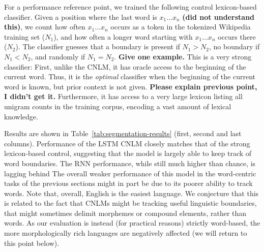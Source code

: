 For a performance reference point, we trained the following control
lexicon-based classifier.  Given a position where the last word is
$x_1...x_n$ \textbf{(did not understand this)}, we count how often
$x_1...x_n$ occurs as a token in the tokenized Wikipedia training set
($N_1$), and how often a longer word starting with $x_1...x_n$ occurs
there ($N_2$).  The classifier guesses that a boundary is present if
$N_1 > N_2$, no boundary if $N_1 < N_2$, and randomly if $N_1 =
N_2$. \textbf{Give one example.}  This is a very strong classifier:
First, unlike the CNLM, it has oracle access to the beginning of the
current word.  Thus, it is the \emph{optimal} classifier when the
beginning of the current word is known, but prior context is not
given. \textbf{Please explain previous point, I didn't get it.}
Furthermore, it has access to a very large lexicon listing all unigram
counts in the training corpus, encoding a vast amount of lexical
knowledge.

Results are shown in Table~\ref{tab:segmentation-results} (first,
second and last columns). Performance of the LSTM CNLM closely matches
that of the strong lexicon-based control, suggesting that the model is
largely able to keep track of word boundaries. The RNN performance,
while still much higher than chance, is lagging behind The overall
weaker performance of this model in the word-centric tasks of the
previous sections might in part be due to its poorer ability to track
words. %
Note that, overall, English is the easiest language. We conjecture
that this is related to the fact that CNLMs might be tracking useful
linguistic boundaries, that might sometimes delimit morphemes or
compound elements, rather than words. As our evaluation is instead
(for practical reasons) strictly word-based, the more morphologically
rich languages are negatively affected (we will return to this point
below).

